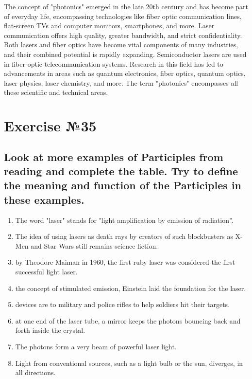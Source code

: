 The concept of "photonics" emerged in the late 20th century and has become part of
everyday life, encompassing technologies like fiber optic communication lines,
flat-screen TVs and computer monitors, smartphones, and more. Laser communication
offers high quality, greater bandwidth, and strict confidentiality. Both lasers and
fiber optics have become vital components of many industries, and their combined
potential is rapidly expanding. Semiconductor lasers are used in fiber-optic
telecommunication systems. Research in this field has led to advancements in areas
such as quantum electronics, fiber optics, quantum optics, laser physics, laser
chemistry, and more. The term "photonics" encompasses all these scientific and
technical areas.

\section{Exercise №35}
\subsection*{Look at more examples of Participles from reading and complete the table. Try to define
      the meaning and function of the Participles in these examples.}
\begin{enumerate}
      \item The word "laser" stands for "light amplification by  emission of radiation”.
      \item The idea of using lasers as death rays  by creators of such blockbusters as X-Men
            and Star Wars still remains science fiction.
      \item {} by Theodore Maiman in 1960, the first ruby laser was considered
            the first successful light laser.
      \item {} the concept of stimulated emission, Einstein laid the foundation for the
            laser.
      \item {} devices are  to military and police rifles to help soldiers hit their targets.
      \item {} at one end of the laser tube, a mirror keeps the photons bouncing back and
            forth inside the crystal.
      \item The  photons form a very  beam of powerful laser light.
      \item Light from conventional sources, such as a light bulb or the sun, diverges,  in all
            directions.
\end{enumerate}

